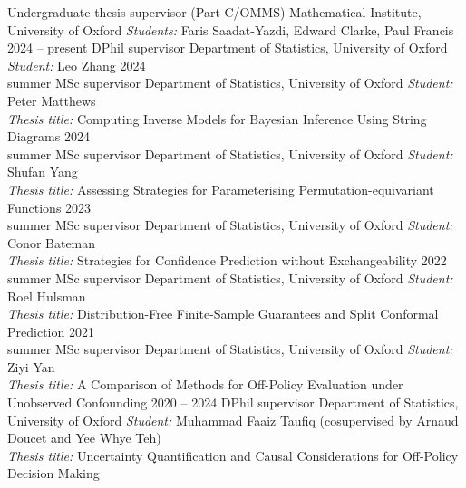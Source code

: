 \documentclass[9pt]{developercv} %
\begin{document}
\begin{entrylist}
        {Undergraduate thesis supervisor (Part C/OMMS)}
        {Mathematical Institute, University of Oxford}
        {\emph{Students:} Faris Saadat-Yazdi, Edward Clarke, Paul Francis}
    \entry
        {2024 -- present}
        {DPhil supervisor}
        {Department of Statistics, University of Oxford}
        {\emph{Student:} Leo Zhang}
    \entry
        {2024\\\footnotesize{summer}}
        {MSc supervisor}
        {Department of Statistics, University of Oxford}
        {\emph{Student:} Peter Matthews \\ \emph{Thesis title:} Computing Inverse Models for Bayesian Inference Using String Diagrams}
    \entry
        {2024\\\footnotesize{summer}}
        {MSc supervisor}
        {Department of Statistics, University of Oxford}
        {\emph{Student:} Shufan Yang \\ \emph{Thesis title:} Assessing Strategies for Parameterising Permutation-equivariant Functions}
    \entry
        {2023\\\footnotesize{summer}}
        {MSc supervisor}
        {Department of Statistics, University of Oxford}
        {\emph{Student:} Conor Bateman \\ \emph{Thesis title:} Strategies for Confidence Prediction without Exchangeability}
    \entry
        {2022\\\footnotesize{summer}}
        {MSc supervisor}
        {Department of Statistics, University of Oxford}
        {\emph{Student:} Roel Hulsman \\ \emph{Thesis title:} Distribution-Free Finite-Sample Guarantees and Split Conformal Prediction}
    \entry
        {2021\\\footnotesize{summer}}
        {MSc supervisor}
        {Department of Statistics, University of Oxford}
        {\emph{Student:} Ziyi Yan \\ \emph{Thesis title:} A Comparison of Methods for Off-Policy Evaluation under Unobserved Confounding}
    \entry
        {2020 -- 2024}
        {DPhil supervisor}
        {Department of Statistics, University of Oxford}
        {\emph{Student:} Muhammad Faaiz Taufiq (cosupervised by Arnaud Doucet and Yee Whye Teh) \\
        \emph{Thesis title:} Uncertainty Quantification and Causal Considerations for Off-Policy Decision Making}
\end{entrylist}
\end{document}
